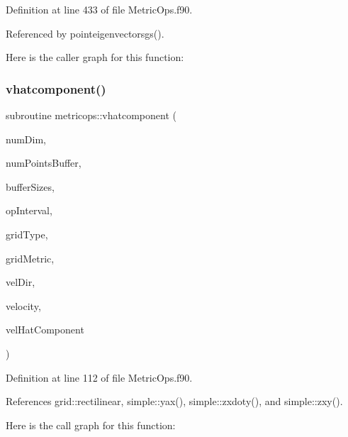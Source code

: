 Definition at line 433 of file Metric\+Ops.\+f90.



Referenced by pointeigenvectorsgs().

Here is the caller graph for this function\+:
\hypertarget{namespacemetricops_af0813d14ff29789b3c8f479b4bcecd3d}{}\label{namespacemetricops_af0813d14ff29789b3c8f479b4bcecd3d} 
\subsubsection{\texorpdfstring{vhatcomponent()}{vhatcomponent()}}
{\footnotesize\ttfamily subroutine metricops\+::vhatcomponent (\begin{DoxyParamCaption}\item[{integer(kind=4), intent(in)}]{num\+Dim,  }\item[{integer(kind=8), intent(in)}]{num\+Points\+Buffer,  }\item[{integer(kind=8), dimension(numdim), intent(in)}]{buffer\+Sizes,  }\item[{integer(kind=8), dimension(2$\ast$numdim), intent(in)}]{op\+Interval,  }\item[{integer(kind=4), intent(in)}]{grid\+Type,  }\item[{real(kind=8), dimension(numdim$\ast$numdim$\ast$numpointsbuffer), intent(in), target}]{grid\+Metric,  }\item[{integer(kind=4), intent(in)}]{vel\+Dir,  }\item[{real(kind=8), dimension(numdim$\ast$numpointsbuffer), intent(in), target}]{velocity,  }\item[{real(kind=8), dimension(numpointsbuffer), intent(out)}]{vel\+Hat\+Component }\end{DoxyParamCaption})}



Definition at line 112 of file Metric\+Ops.\+f90.



References grid\+::rectilinear, simple\+::yax(), simple\+::zxdoty(), and simple\+::zxy().

Here is the call graph for this function\+:

